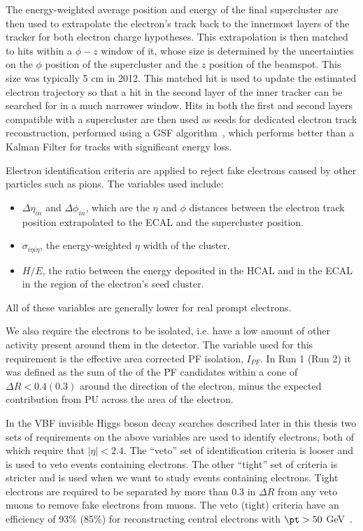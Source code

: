 The energy-weighted average position and energy of the final supercluster are then used to extrapolate the electron's track back to the innermost layers of the tracker for both electron charge hypotheses. This extrapolation is then matched to hits within a $\phi - z$ window of it, whose size is determined by the uncertainties on the $\phi$ position of the supercluster and the $z$ position of the beamspot. This size was typically 5 cm in 2012. This matched hit is used to update the estimated electron trajectory so that a hit in the second layer of the inner tracker can be searched for in a much narrower window. Hits in both the first and second layers compatible with a supercluster are then used as seeds for dedicated electron track reconstruction, performed using a \ac{GSF} algorithm~\cite{GSFalgorithm}, which performs better than a Kalman Filter for tracks with significant energy loss.

Electron identification criteria are applied to reject fake electrons caused by other particles such as pions. The variables used include:
\begin{itemize}
\item $\Delta\eta_{in}$ and $\Delta\phi_{in}$, which are the $\eta$ and $\phi$ distances between the electron track position extrapolated to the \ac{ECAL} and the supercluster position.
\item $\sigma_{i\eta i\eta}$, the energy-weighted $\eta$ width of the cluster.
\item $H/E$, the ratio between the energy deposited in the \ac{HCAL} and in the \ac{ECAL} in the region of the electron's seed cluster.
\end{itemize}
All of these variables are generally lower for real prompt electrons.

We also require the electrons to be isolated, i.e. have a low amount of other activity present around them in the detector. The variable used for this requirement is the effective area corrected \ac{PF} isolation, $I_{PF}$. In Run 1 (Run 2) it was defined as the sum of the \pt of the \ac{PF} candidates within a cone of $\Delta R<0.4(0.3)$ around the direction of the electron, minus the expected contribution from \ac{PU} across the area of the electron.

In the \ac{VBF} invisible Higgs boson decay searches described later in this thesis two sets of requirements on the above variables are used to identify electrons, both of which require that $|\eta|<2.4$. The ``veto'' set of identification criteria is looser and is used to veto events containing electrons. The other ``tight'' set of criteria is stricter and is used when we want to study events containing electrons. Tight electrons are required to be separated by more than 0.3 in $\Delta R$ from any veto muons to remove fake electrons from muons. The veto (tight) criteria have an efficiency of 93\% (85\%) for reconstructing central electrons with $\pt>50$ GeV~\cite{eleeff}.

